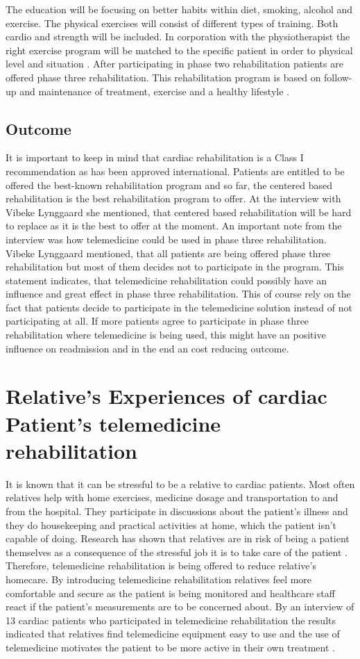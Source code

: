 The education will be focusing on better habits within diet, smoking, alcohol and exercise. The physical exercises will consist of different types of training. Both cardio and strength will be included. In corporation with the physiotherapist the right exercise program will be matched to the specific patient in order to physical level and situation \cite{herning}. After participating in phase two rehabilitation patients are offered phase three rehabilitation. This rehabilitation program is based on follow-up and maintenance of treatment, exercise and a healthy lifestyle \cite{Rehabilitering}.

\subsection{Outcome}  
It is important to keep in mind that cardiac rehabilitation is a Class I recommendation as has been approved international. Patients are entitled to be offered the best-known rehabilitation program and so far, the centered based rehabilitation is the best rehabilitation program to offer. At the interview with Vibeke Lynggaard she mentioned, that centered based rehabilitation will be hard to replace as it is the best to offer at the moment. An important note from the interview was how telemedicine could be used in phase three rehabilitation. Vibeke Lynggaard mentioned, that all patients are being offered phase three rehabilitation but most of them decides not to participate in the program. This statement indicates, that telemedicine rehabilitation could possibly have an influence and great effect in phase three rehabilitation. This of course rely on the fact that patients decide to participate in the telemedicine solution instead of not participating at all. If more patients agree to participate in phase three rehabilitation where telemedicine is being used, this might have an positive influence on readmission and in the end an cost reducing outcome.  


\section{Relative’s Experiences of cardiac Patient’s telemedicine rehabilitation}
It is known that it can be stressful to be a relative to cardiac patients. Most often relatives help with home exercises, medicine dosage and transportation to and from the hospital. They participate in discussions about the patient’s illness and they do housekeeping and practical activities at home, which the patient isn't capable of doing. Research has shown that relatives are in risk of being a patient themselves as a consequence of the stressful job it is to take care of the patient \cite{4, 5}. Therefore, telemedicine rehabilitation is being offered to reduce relative’s homecare. By introducing telemedicine rehabilitation relatives feel more comfortable and secure as the patient is being monitored and healthcare staff react if the patient’s measurements are to be concerned about. By an interview of 13 cardiac patients who participated in telemedicine rehabilitation the results indicated that relatives find telemedicine equipment easy to use and the use of telemedicine motivates the patient to be more active in their own treatment \cite{12}.  

